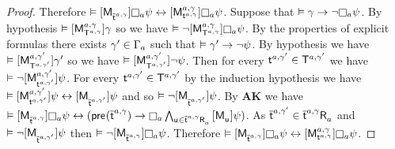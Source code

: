 \begin{proof}
Therefore $\entails \actionA{\aPModel{\aPStateT[\agentA, \gamma]}} \necessaryA \psi \iff \actionA{\aPModel[\agentA, \gamma]{\aStateT[\agentA, \gamma]}} \necessaryA \psi$.
Suppose that $\entails \gamma \implies \lnot \necessaryA \psi$.
By hypothesis $\entails \actionA{\aPModel[\agentA, \gamma]{\aStatesT[\agentA, \gamma]}} \gamma$ so we have $\entails \lnot \actionA{\aPModel[\agentA, \gamma]{\aStatesT[\agentA, \gamma]}} \necessaryA \psi$.
By the properties of explicit formulas there exists $\gamma' \in \Gamma_\agentA$ such that $\entails \gamma' \implies \lnot \psi$.
By hypothesis we have $\entails \actionA{\aPModel[\agentA, \gamma']{\aStatesT[\agentA, \gamma']}} \gamma'$ so we have $\entails \actionA{\aPModel[\agentA, \gamma']{\aStatesT[\agentA, \gamma']}} \lnot \psi$.
Then for every $\aStateT[\agentA, \gamma'] \in \aStatesT[\agentA, \gamma']$ we have $\entails \lnot \actionA{\aPModel[\agentA, \gamma']{\aStateT[\agentA, \gamma']}} \psi$.
For every $\aStateT[\agentA, \gamma'] \in \aStatesT[\agentA, \gamma']$ by the induction hypothesis we have $\entails \actionA{\aPModel[\agentA, \gamma']{\aStateT[\agentA, \gamma']}} \psi \iff \actionA{\aPModel{\aPStateT[\agentA, \gamma']}} \psi$ and so $\entails \lnot \actionA{\aPModel{\aPStateT[\agentA, \gamma']}} \psi$.
By {\bf AK} we have $\entails \actionA{\aPModel{\aPStateT[\agentA, \gamma]}} \necessaryA \psi \iff (\aPrecondition(\aPStateT[\agentA, \gamma]) \implies \necessaryA \bigwedge_{\aStateU \in \aSuccessorsA{\aPStateT[\agentA, \gamma]}}  \actionA{\aPModel{\aStateU}} \psi)$.
As $\aPStateT[\agentA, \gamma'] \in \aSuccessorsA{\aPStateT[\agentA, \gamma]}$ and $\entails \lnot \actionA{\aPModel{\aPStateT[\agentA, \gamma']}} \psi$ then $\entails \lnot \actionA{\aPModel{\aPStateT[\agentA, \gamma]}} \necessaryA \psi$.
Therefore $\entails \actionA{\aPModel{\aPStateT[\agentA, \gamma]}} \necessaryA \psi \iff \actionA{\aPModel[\agentA, \gamma]{\aStateT[\agentA, \gamma]}} \necessaryA \psi$.


\end{proof}
